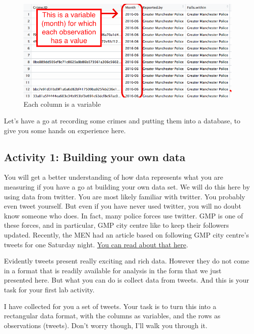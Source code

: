 \documentclass[]{book}
\theoremstyle{definition}
\theoremstyle{definition}
\theoremstyle{definition}
\theoremstyle{remark}
\begin{document}
\begin{figure}
\centering
\includegraphics{imgs/columnIsVariable.png}
\caption{Each column is a variable}
\end{figure}

Let's have a go at recording some crimes and putting them into a
database, to give you some hands on experience here.

\hypertarget{activity-1-building-your-own-data}{%
\subsection{Activity 1: Building your own
data}\label{activity-1-building-your-own-data}}

 You will get a better understanding of how data represents what you are
measuring if you have a go at building your own data set. We will do
this here by using data from twitter. You are most likely familiar with
twitter. You probably even tweet yourself. But even if you have never
used twitter, you will no doubt know someone who does. In fact, many
police forces use twitter. GMP is one of these forces, and in
particular, GMP city centre like to keep their followers updated.
Recently, the MEN had an article based on following GMP city centre's
tweets for one Saturday night.
\href{http://www.manchestereveningnews.co.uk/news/greater-manchester-news/what-police-city-centre-deal-13441129}{You
can read about that here}.

Evidently tweets present really exciting and rich data. However they do
not come in a format that is readily available for analysis in the form
that we just presented here. But what you can do is collect data from
tweets. And this is your task for your first lab activity.

I have collected for you a set of tweets. Your task is to turn this into
a rectangular data format, with the columns as variables, and the rows
as observations (tweets). Don't worry though, I'll walk you through it.
\end{document}
